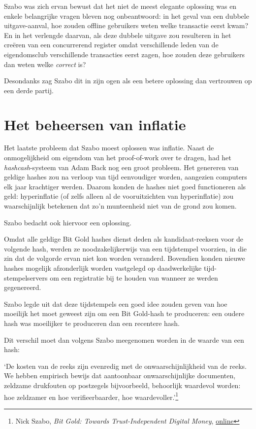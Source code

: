 \documentclass[
  a5paper,
  smalldemyvopaper,11pt,twoside,onecolumn,openright,extrafontsizes,
hidelinks]{memoir}
\renewenvironment{quote}%
               {\list{}{\rightmargin=.3cm\leftmargin=.3cm}%
                \itshape \item[]}%
               {\endlist}
\begin{document}
Szabo was zich ervan bewust dat het niet de meest elegante oplossing was
en enkele belangrijke vragen bleven nog onbeantwoord: in het geval van
een dubbele uitgave-aanval, hoe zouden offline gebruikers weten welke
transactie eerst kwam? En in het verlengde daarvan, als deze dubbele
uitgave zou resulteren in het creëren van een concurrerend register
omdat verschillende leden van de eigendomsclub verschillende transacties
eerst zagen, hoe zouden deze gebruikers dan weten welke \emph{correct}
is?

Desondanks zag Szabo dit in zijn ogen als een betere oplossing dan
vertrouwen op een derde partij.

\section{Het beheersen van inflatie}\label{het-beheersen-van-inflatie}

Het laatste probleem dat Szabo moest oplossen was inflatie. 
Naast de onmogelijkheid om eigendom van het proof-of-work over te
dragen, had het \emph{hashcash}-systeem van Adam Back nog een groot
probleem. Het genereren van geldige hashes zou na verloop van tijd
eenvoudiger worden, aangezien computers elk jaar krachtiger werden.
Daarom konden de hashes niet goed functioneren als geld: hyperinflatie
(of zelfs alleen al de vooruitzichten van hyperinflatie) zou
waarschijnlijk betekenen dat zo'n munteenheid niet van de grond zou
komen.

Szabo bedacht ook hiervoor een oplossing.

Omdat alle geldige Bit Gold hashes dienst deden als kandidaat-reeksen
voor de volgende hash, werden ze noodzakelijkerwijs van een tijdstempel
voorzien, in die zin dat de volgorde ervan niet kon worden veranderd.
Bovendien konden nieuwe hashes mogelijk afzonderlijk worden vastgelegd
op daadwerkelijke tijd-stempelservers om een registratie bij te houden
van wanneer ze werden gegenereerd.

Szabo legde uit dat deze tijdstempels een goed idee zouden geven van hoe
moeilijk het moet geweest zijn om een Bit Gold-hash te produceren: een
oudere hash was moeilijker te produceren dan een recentere hash.

Dit verschil moet dan volgens Szabo meegenomen worden in de waarde van
een hash:

\begin{quote}
`De kosten van de reeks zijn evenredig met de onwaarschijnlijkheid van
de reeks. We hebben empirisch bewijs dat aantoonbaar onwaarschijnlijke
documenten, zeldzame drukfouten op postzegels bijvoorbeeld, behoorlijk
waardevol worden: hoe zeldzamer en hoe verifieerbaarder, hoe
waardevoller.'\footnote{Nick Szabo, \emph{Bit Gold: Towards
  Trust-Independent Digital Money},
  \href{https://web.archive.org/web/20140406003811/http://szabo.best.vwh.net/bitgold.html}{online}}
\end{quote}
\end{document}
